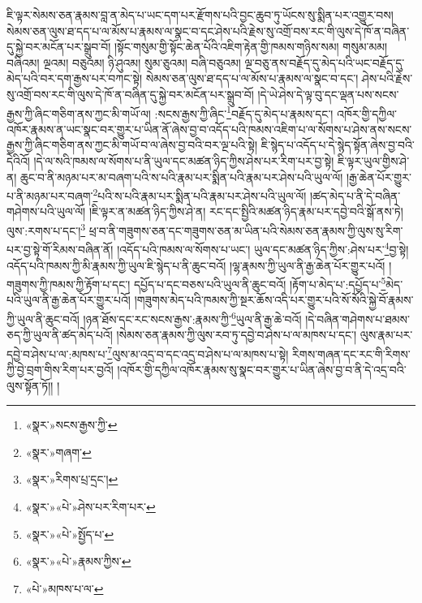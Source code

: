 ཇི་ལྟར་སེམས་ཅན་རྣམས་བླ་ན་མེད་པ་ཡང་དག་པར་རྫོགས་པའི་བྱང་ཆུབ་ཏུ་ཡོངས་སུ་སྨིན་པར་འགྱུར་བས། སེམས་ཅན་ལུས་ཐ་དད་པ་ལ་མོས་པ་རྣམས་ལ་སྣང་བ་དང་ཤེས་པའི་རྗེས་སུ་འགྲོ་བས་རང་གི་ལུས་དེ་ཁོ་ན་བཞིན་དུ་སྐྱེ་བར་མངོན་པར་སྒྲུབ་བོ། །སྟོང་གསུམ་གྱི་སྟོང་ཆེན་པོའི་འཇིག་རྟེན་གྱི་ཁམས་གཉིས་སམ། གསུམ་མམ། བཞིའམ། ལྔའམ། བཅུའམ། ཉི་ཤུའམ། སུམ་ཅུའམ། བཞི་བཅུའམ། ལྔ་བཅུ་ནས་བརྗོད་དུ་མེད་པའི་ཡང་བརྗོད་དུ་མེད་པའི་བར་དག་རྒྱས་པར་བཀང་སྟེ། སེམས་ཅན་ལུས་ཐ་དད་པ་ལ་མོས་པ་རྣམས་ལ་སྣང་བ་དང་། ཤེས་པའི་རྗེས་སུ་འགྲོ་བས་རང་གི་ལུས་དེ་ཁོ་ན་བཞིན་དུ་སྐྱེ་བར་མངོན་པར་སྒྲུབ་བོ། །དེ་ཡེ་ཤེས་དེ་ལྟ་བུ་དང་ལྡན་པས་སངས་རྒྱས་ཀྱི་ཞིང་གཅིག་ནས་ཀྱང་མི་གཡོ་ལ། :སངས་རྒྱས་ཀྱི་ཞིང་\footnote{«སྣར་»སངས་རྒྱས་ཀྱི་}བརྗོད་དུ་མེད་པ་རྣམས་དང་། འཁོར་གྱི་དཀྱིལ་འཁོར་རྣམས་ན་ཡང་སྣང་བར་གྱུར་པ་ཡིན་ནོ་ཞེས་བྱ་བ་འདོད་པའི་ཁམས་འཇིག་པ་ལ་སོགས་པ་ཤེས་ནས་སངས་རྒྱས་ཀྱི་ཞིང་གཅིག་ནས་ཀྱང་མི་གཡོ་བ་ལ་ཞེས་བྱ་བའི་བར་ལྔ་པའི་སྟེ། ཇི་སྙེད་པ་འདོད་པ་དེ་སྙེད་སྟོན་ཞེས་བྱ་བའི་དེའིའོ། །དེ་ལ་སའི་ཁམས་ལ་སོགས་པ་ནི་ཡུལ་དང་མཚན་ཉིད་ཀྱིས་ཤེས་པར་རིག་པར་བྱ་སྟེ། ཇི་ལྟར་ཡུལ་གྱིས་ཤེ་ན། ཆུང་བ་ནི་མཉམ་པར་མ་བཞག་པའི་ས་པའི་རྣམ་པར་སྨིན་པའི་རྣམ་པར་ཤེས་པའི་ཡུལ་ལོ། །རྒྱ་ཆེན་པོར་གྱུར་པ་ནི་མཉམ་པར་བཞག་\footnote{«སྣར་»གཞག་}པའི་ས་པའི་རྣམ་པར་སྨིན་པའི་རྣམ་པར་ཤེས་པའི་ཡུལ་ལོ། །ཚད་མེད་པ་ནི་དེ་བཞིན་གཤེགས་པའི་ཡུལ་ལོ། །ཇི་ལྟར་ན་མཚན་ཉིད་ཀྱིས་ཤེ་ན། རང་དང་སྤྱིའི་མཚན་ཉིད་རྣམ་པར་དབྱེ་བའི་སྒོ་ནས་ཏེ། ལུས་:རགས་པ་དང་།\footnote{«སྣར་»རིགས་པྲ་དྲང་།} ཕྲ་བ་ནི་གཟུགས་ཅན་དང་གཟུགས་ཅན་མ་ཡིན་པའི་སེམས་ཅན་རྣམས་ཀྱི་ལུས་སུ་རིག་པར་བྱ་སྟེ་གོ་རིམས་བཞིན་ནོ། །འདོད་པའི་ཁམས་ལ་སོགས་པ་ཡང་། ཡུལ་དང་མཚན་ཉིད་ཀྱིས་:ཤེས་པར་\footnote{«སྣར་»«པེ་»ཤེས་པར་རིག་པར་}བྱ་སྟེ། འདོད་པའི་ཁམས་ཀྱི་མི་རྣམས་ཀྱི་ཡུལ་ཇི་སྙེད་པ་ནི་ཆུང་བའོ། །ལྷ་རྣམས་ཀྱི་ཡུལ་ནི་རྒྱ་ཆེན་པོར་གྱུར་པའོ། །གཟུགས་ཀྱི་ཁམས་ཀྱི་རྟོག་པ་དང་། དཔྱོད་པ་དང་བཅས་པའི་ཡུལ་ནི་ཆུང་བའོ། །རྟོག་པ་མེད་པ་:དཔྱོད་པ་\footnote{«སྣར་»«པེ་»སྤྱོད་པ་}མེད་པའི་ཡུལ་ནི་རྒྱ་ཆེན་པོར་གྱུར་པའོ། །གཟུགས་མེད་པའི་ཁམས་ཀྱི་སྔར་ཆོས་འདི་པར་གྱུར་པའི་སོ་སོའི་སྐྱེ་བོ་རྣམས་ཀྱི་ཡུལ་ནི་ཆུང་བའོ། །ཉན་ཐོས་དང་རང་སངས་རྒྱས་:རྣམས་ཀྱི་\footnote{«སྣར་»«པེ་»རྣམས་ཀྱིས་}ཡུལ་ནི་རྒྱ་ཆེ་བའོ། །དེ་བཞིན་གཤེགས་པ་ཐམས་ཅད་ཀྱི་ཡུལ་ནི་ཚད་མེད་པའོ། །སེམས་ཅན་རྣམས་ཀྱི་ལུས་རབ་ཏུ་དབྱེ་བ་ཤེས་པ་ལ་མཁས་པ་དང་། ལུས་རྣམ་པར་དབྱེ་བ་ཤེས་པ་ལ་:མཁས་པ་\footnote{«པེ་»མཁས་པ་ལ་}ལུས་མ་འདྲ་བ་དང་འདྲ་བ་ཤེས་པ་ལ་མཁས་པ་སྟེ། རིགས་གཞན་དང་རང་གི་རིགས་ཀྱི་བྱེ་བྲག་གིས་རིག་པར་བྱའོ། །འཁོར་གྱི་དཀྱིལ་འཁོར་རྣམས་སུ་སྣང་བར་གྱུར་པ་ཡིན་ཞེས་བྱ་བ་ནི་དེ་འདྲ་བའི་ལུས་སྟོན་ཏོ།། །
